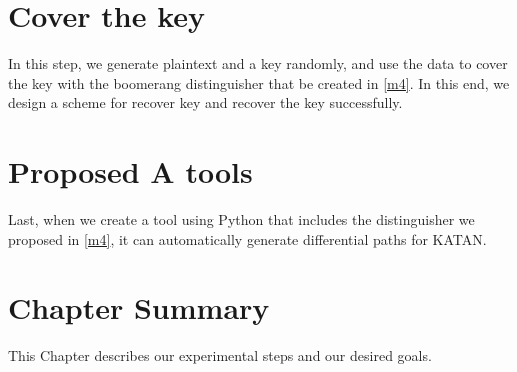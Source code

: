 \section{Cover the key}
In this step, we generate plaintext and a key randomly, and use the data to cover the key with the boomerang distinguisher that be created in \ref{m4}. In this end, we design a scheme for recover key and recover the key successfully.

\section{Proposed A tools}
Last, when we create a tool using Python that includes the distinguisher we proposed in \ref{m4}, it can automatically generate differential paths for KATAN.


\section{Chapter Summary}
This Chapter describes our experimental steps and our desired goals.